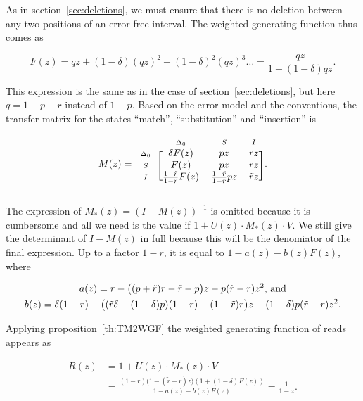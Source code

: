 \documentclass{article}
\newcommand{\smI}{\scriptstyle{I}}
\newcommand{\smS}{\scriptstyle{S}}
\newcommand{\smDELz}{\scriptstyle{\Delta_0}}
\begin{document}
As in section~\ref{sec:deletions}, we must ensure that there is no deletion
between any two positions of an error-free interval. The weighted
generating function thus comes as

\begin{equation*}
F(z) = qz + (1-\delta)(qz)^2 + (1-\delta)^2(qz)^3 \ldots =
\frac{qz}{1-(1-\delta)qz}.
\end{equation*}

This expression is the same as in the case of section~\ref{sec:deletions},
but here $q = 1-p-r$ instead of $1-p$. Based on the error model and the
conventions, the transfer matrix for the states ``match'',
``substitution'' and ``insertion'' is

\begin{equation*}
M(z) = 
\begin{blockarray}{cccc}
       & \smDELz & \smS & \smI \\
\begin{block}{c[ccc]}
\smDELz & \delta F(z) & pz & rz \\
\smS    &        F(z) & pz & rz \\
\smI    & \frac{1-\tilde{r}}{1-r}F(z)
           & \frac{1-\tilde{r}}{1-r}pz & \tilde{r}z \\
\end{block}
\end{blockarray}.
\end{equation*}


The expression of $M_*(z) = (I-M(z))^{-1}$ is omitted because it is
cumbersome and all we need is the value if $1+U(z)\cdot M_*(z)\cdot V$.
We still give the determinant of $I-M(z)$ in full because this will be the
denomiator of the final expression. Up to a factor $1-r$, it is equal to
$1-a(z)-b(z)F(z)$, where

\begin{gather}
\label{eq:a+b}
a(z) = r-\big((p+\tilde{r})r-\tilde{r}-p\big)z
- p(\tilde{r}-r)z^2\text{, and} \\
b(z) = \delta(1-r) - \big((\tilde{r}\delta-(1-\delta)p)(1-r)
-(1-\tilde{r})r\big)z -(1-\delta)p(\tilde{r}-r)z^2.
\notag
\end{gather}

Applying proposition~\ref{th:TM2WGF} the weighted generating function of
reads appears as

\begin{equation}
\label{eq:Rindel}
\begin{split}
R(z) &= 1 + U(z) \cdot M_*(z) \cdot V \\
&= \frac{(1-r)\big( 1-(\tilde{r}-r)z \big)
\left(1+(1-\delta)F(z) \right)}{1-a(z)-b(z)F(z)}
= \frac{1}{1-z}.
\end{split}
\end{equation}
\end{document}
